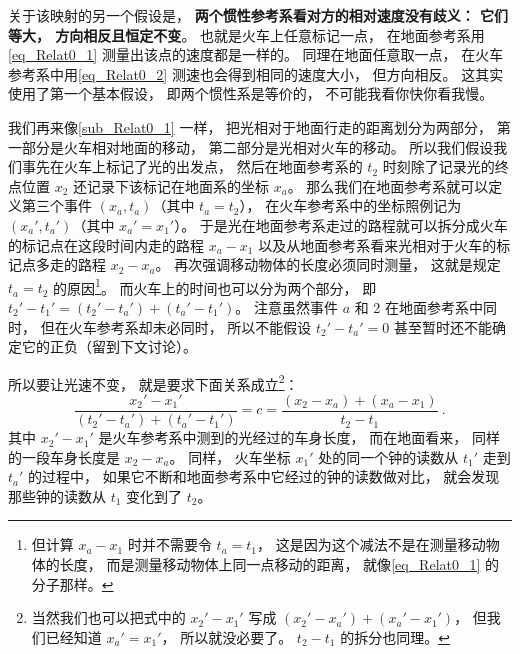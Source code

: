 关于该映射的另一个假设是， \textbf{两个惯性参考系看对方的相对速度没有歧义： 它们等大， 方向相反且恒定不变}。 也就是火车上任意标记一点， 在地面参考系用\autoref{eq_Relat0_1} 测量出该点的速度都是一样的。 同理在地面任意取一点， 在火车参考系中用\autoref{eq_Relat0_2} 测速也会得到相同的速度大小， 但方向相反。 这其实使用了第一个基本假设， 即两个惯性系是等价的， 不可能我看你快你看我慢。

我们再来像\autoref{sub_Relat0_1} 一样， 把光相对于地面行走的距离划分为两部分， 第一部分是火车相对地面的移动， 第二部分是光相对火车的移动。 所以我们假设我们事先在火车上标记了光的出发点， 然后在地面参考系的 $t_2$ 时刻除了记录光的终点位置 $x_2$ 还记录下该标记在地面系的坐标 $x_a$。 那么我们在地面参考系就可以定义第三个事件 $(x_a, t_a)$（其中 $t_a = t_2$）， 在火车参考系中的坐标照例记为 $(x_a', t_a')$（其中 $x_a' = x_1'$）。 于是光在地面参考系走过的路程就可以拆分成火车的标记点在这段时间内走的路程 $x_a - x_1$ 以及从地面参考系看来光相对于火车的标记点多走的路程 $x_2 - x_a$。 再次强调移动物体的长度必须同时测量， 这就是规定 $t_a = t_2$ 的原因\footnote{但计算 $x_a-x_1$ 时并不需要令 $t_a = t_1$， 这是因为这个减法不是在测量移动物体的长度， 而是测量移动物体上同一点移动的距离， 就像\autoref{eq_Relat0_1} 的分子那样。}。 而火车上的时间也可以分为两个部分， 即 $t_2' - t_1' = (t_2' - t_a') + (t_a' - t_1')$。 注意虽然事件 $a$ 和 2 在地面参考系中同时， 但在火车参考系却未必同时， 所以不能假设 $t_2' - t_a' = 0$ 甚至暂时还不能确定它的正负（留到下文讨论）。

所以要让光速不变， 就是要求下面关系成立\footnote{当然我们也可以把式中的 $x_2' - x_1'$ 写成 $(x_2'-x_a') + (x_a'-x_1')$， 但我们已经知道 $x_a'=x_1'$， 所以就没必要了。 $t_2-t_1$ 的拆分也同理。}：
\begin{equation} \label{eq_Relat0_3}
\frac{x_2' - x_1'}{(t_2' - t_a') + (t_a' - t_1')} = c = \frac{(x_2 - x_a) + (x_a - x_1)}{t_2 - t_1}~.
\end{equation}
其中 $x_2' - x_1'$ 是火车参考系中测到的光经过的车身长度， 而在地面看来， 同样的一段车身长度是 $x_2 - x_a$。 同样， 火车坐标 $x_1'$ 处的同一个钟的读数从 $t_1'$ 走到 $t_a'$ 的过程中， 如果它不断和地面参考系中它经过的钟的读数做对比， 就会发现那些钟的读数从 $t_1$ 变化到了 $t_2$。

